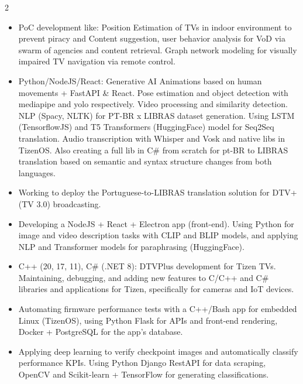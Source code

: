 \documentclass[10pt,a4paper,ragged2e,withhyper]{altacv}
\begin{document}
\begin{paracol}{2}


\begin{itemize}


    \item PoC development like: Position Estimation of TVs in indoor environment to prevent piracy and Content suggestion, user behavior analysis for VoD via swarm of agencies and content retrieval. Graph network modeling for visually impaired TV navigation via remote control.

    \item Python/NodeJS/React: Generative AI Animations based on human movements + FastAPI \& React. Pose estimation and object detection with mediapipe and yolo respectively. Video processing and similarity detection. NLP (Spacy, NLTK) for PT-BR x LIBRAS dataset generation. Using LSTM (TensorflowJS) and T5 Transformers (HuggingFace) model for Seq2Seq translation. Audio transcription with Whisper and Vosk and native libs in TizenOS. Also creating a full lib in C\# from scratch for pt-BR to LIBRAS translation based on semantic and syntax structure changes from both languages.

    \item Working to deploy the Portuguese-to-LIBRAS translation solution for DTV+ (TV 3.0) broadcasting.
    
    \item Developing a NodeJS + React + Electron app (front-end). Using Python for image and video description tasks with CLIP and BLIP models, and applying NLP and Transformer models for paraphrasing (HuggingFace).
    
    \item C++ (20, 17, 11), C\# (.NET 8): DTVPlus development for Tizen TVs. Maintaining, debugging, and adding new features to C/C++ and C\# libraries and applications for Tizen, specifically for cameras and IoT devices.
    
    \item Automating firmware performance tests with a C++/Bash app for embedded Linux (TizenOS), using Python Flask for APIs and front-end rendering, Docker + PostgreSQL for the app's database.
    
    \item Applying deep learning to verify checkpoint images and automatically classify performance KPIs. Using Python Django RestAPI for data scraping, OpenCV and Scikit-learn + TensorFlow for generating classifications.
    

\end{itemize}
\end{paracol}
\end{document}
